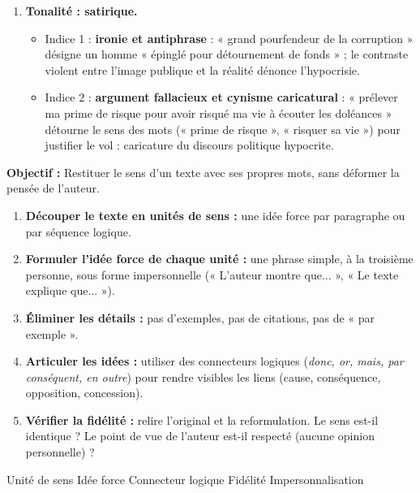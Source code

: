 \documentclass[11pt]{article}
\newcommand{\cle}[1]{{\popxbold\color{popdark}#1}}
\begin{document}
\begin{exoresolu}
\begin{enumerate}
\begin{itemize}
    \end{itemize}
    \item \textbf{Tonalité : satirique.}
    \begin{itemize}
        \item Indice 1 : \textbf{ironie et antiphrase} : « grand pourfendeur de la corruption » désigne un homme « épinglé pour détournement de fonds » ; le contraste violent entre l'image publique et la réalité dénonce l'hypocrisie.
        \item Indice 2 : \textbf{argument fallacieux et cynisme caricatural} : « prélever ma prime de risque pour avoir risqué ma vie à écouter les doléances » détourne le sens des mots (« prime de risque », « risquer sa vie ») pour justifier le vol : caricature du discours politique hypocrite.
    \end{itemize}
\end{enumerate}
\end{exoresolu}

\begin{methode}
\textbf{Objectif :} Restituer le sens d'un texte avec ses propres mots, sans déformer la pensée de l'auteur.
\begin{enumerate}
    \item \textbf{Découper le texte en unités de sens :} une idée force par paragraphe ou par séquence logique.
    \item \textbf{Formuler l'idée force de chaque unité :} une phrase simple, à la troisième personne, sous forme impersonnelle (« L'auteur montre que... », « Le texte explique que... »).
    \item \textbf{Éliminer les détails :} pas d'exemples, pas de citations, pas de « par exemple ».
    \item \textbf{Articuler les idées :} utiliser des connecteurs logiques (\emph{donc, or, mais, par conséquent, en outre}) pour rendre visibles les liens (cause, conséquence, opposition, concession).
    \item \textbf{Vérifier la fidélité :} relire l'original et la reformulation. Le sens est-il identique ? Le point de vue de l'auteur est-il respecté (aucune opinion personnelle) ?
\end{enumerate}
\cle{Unité de sens} \cle{Idée force} \cle{Connecteur logique} \cle{Fidélité} \cle{Impersonnalisation}
\end{methode}
\end{document}
